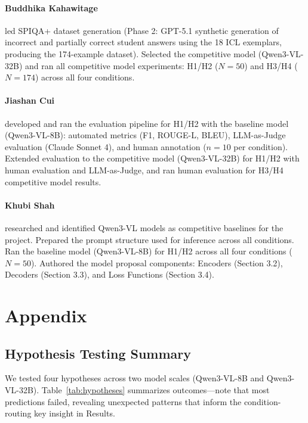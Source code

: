 \documentclass{article} %
\begin{document}
\paragraph{Buddhika Kahawitage} led SPIQA+ dataset generation (Phase 2: GPT-5.1 synthetic generation of incorrect and partially correct student answers using the 18 ICL exemplars, producing the 174-example dataset). Selected the competitive model (Qwen3-VL-32B) and ran all competitive model experiments: H1/H2 ($N{=}50$) and H3/H4 ($N{=}174$) across all four conditions.

\paragraph{Jiashan Cui} developed and ran the evaluation pipeline for H1/H2 with the baseline model (Qwen3-VL-8B): automated metrics (F1, ROUGE-L, BLEU), LLM-as-Judge evaluation (Claude Sonnet 4), and human annotation ($n{=}10$ per condition). Extended evaluation to the competitive model (Qwen3-VL-32B) for H1/H2 with human evaluation and LLM-as-Judge, and ran human evaluation for H3/H4 competitive model results.

\paragraph{Khubi Shah} researched and identified Qwen3-VL models as competitive baselines for the project. Prepared the prompt structure used for inference across all conditions. Ran the baseline model (Qwen3-VL-8B) for H1/H2 across all four conditions ($N{=}50$). Authored the model proposal components: Encoders (Section 3.2), Decoders (Section 3.3), and Loss Functions (Section 3.4).


\nocite{*}



\appendix
\section{Appendix}

\subsection{Hypothesis Testing Summary}

We tested four hypotheses across two model scales (Qwen3-VL-8B and Qwen3-VL-32B). Table~\ref{tab:hypotheses} summarizes outcomes---note that most predictions failed, revealing unexpected patterns that inform the condition-routing key insight in Results.
\end{document}
